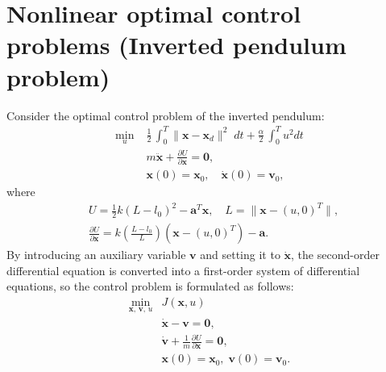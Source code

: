 \documentclass[a4paper, 10pt]{article}
\begin{document}
\section{Nonlinear optimal control problems (Inverted pendulum problem)}
Consider the optimal control problem of the inverted pendulum:
\begin{align*}
    \min_{u}\; &  \tfrac{1}{2}\, \int_{0}^{T} \|\bm{x}-\bm{x}_d\|^{2}\; dt + \tfrac{\alpha}{2} \, \int_{0}^{T} u^{2} dt \\
    & m\ddot{\bm{x}} + \frac{\partial U}{\partial \bm{x}} = \bm{0}, \\
    & \bm{x}(0) = \bm{x}_{0}, \quad \dot{\bm{x}}(0) = \bm{v}_0,
\end{align*}
where
\begin{align*}
    & U = \tfrac{1}{2}k(L-l_0)^2 - \bm{a}^{T}\bm{x},\quad L = \|\bm{x}-(u,0)^{T}\|, \\
    & \frac{\partial U}{\partial\bm{x}} =  k\!\left(\tfrac{L-l_{0}}{L}\right)\!(\bm{x}- (u,0)^{T})-\bm{a}.
\end{align*}
By introducing an auxiliary variable $\bm{v}$ and setting it to $\dot{\bm{x}}$, the second-order differential equation is converted into a first-order system of differential equations, so the control problem is formulated as follows:
\begin{equation}
\label{eq:cont_tim_p}
\begin{aligned}
\min_{\bm{x},\, \bm{v},\, u} & J(\bm{x}, u)
\\
& \dot{\bm{x}} - \bm{v} = \bm{0}, \\
& \dot{\bm{v}} + \frac{1}{m} \frac{\partial U}{\partial\bm{x}} =  \bm{0},
\\
& \bm{x}(0) =\bm{x}_0, \; \bm{v}(0) = \bm{v}_0.
\end{aligned}
\end{equation}
\end{document}
